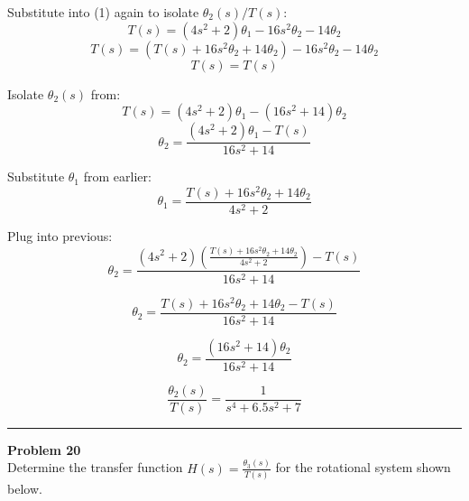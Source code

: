 Substitute into (1) again to isolate \( \theta_2(s)/T(s) \):
\[
T(s) = (4s^2 + 2)\theta_1 - 16s^2 \theta_2 - 14\theta_2
\]
\[
T(s) = \left( T(s) + 16s^2 \theta_2 + 14\theta_2 \right) - 16s^2 \theta_2 - 14\theta_2
\]
\[
T(s) = T(s)
\]

Isolate \( \theta_2(s) \) from:
\[
T(s) = (4s^2 + 2)\theta_1 - (16s^2 + 14)\theta_2
\]
\[
\theta_2 = \frac{(4s^2 + 2)\theta_1 - T(s)}{16s^2 + 14}
\]

Substitute \( \theta_1 \) from earlier:
\[
\theta_1 = \frac{T(s) + 16s^2 \theta_2 + 14\theta_2}{4s^2 + 2}
\]

Plug into previous:
\[
\theta_2 = \frac{(4s^2 + 2)\left( \frac{T(s) + 16s^2 \theta_2 + 14\theta_2}{4s^2 + 2} \right) - T(s)}{16s^2 + 14}
\]

\[
\theta_2 = \frac{T(s) + 16s^2 \theta_2 + 14\theta_2 - T(s)}{16s^2 + 14}
\]

\[
\theta_2 = \frac{(16s^2 + 14)\theta_2}{16s^2 + 14}
\]

\[
\boxed{
\frac{\theta_2(s)}{T(s)} = \frac{1}{s^4 + 6.5s^2 + 7}
}
\]

\newpage

\noindent\rule{\textwidth}{1pt}
\noindent\textbf{Problem 20} \hfill
\\ Determine the transfer function \(H(s) = \frac{\theta_3(s)}{T(s)}\) for the rotational system shown below.

